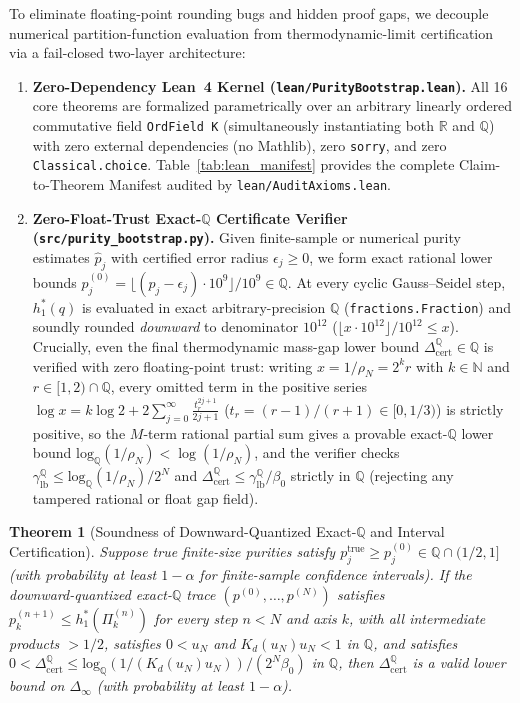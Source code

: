 \documentclass[11pt,a4paper]{article}
\newtheorem{theorem}{Theorem}[section]
\theoremstyle{definition}
\newcommand{\R}{\mathbb{R}}
\newcommand{\Q}{\mathbb{Q}}
\newcommand{\N}{\mathbb{N}}
\begin{document}
To eliminate floating-point rounding bugs and hidden proof gaps, we decouple numerical partition-function evaluation from thermodynamic-limit certification via a fail-closed two-layer architecture:
\begin{enumerate}[leftmargin=1.6em,itemsep=2pt]
  \item \textbf{Zero-Dependency Lean~4 Kernel (\texttt{lean/PurityBootstrap.lean}).} All 16 core theorems are formalized parametrically over an arbitrary linearly ordered commutative field \texttt{OrdField K} (simultaneously instantiating both $\R$ and $\Q$) with zero external dependencies (no Mathlib), zero \texttt{sorry}, and zero \texttt{Classical.choice}. Table~\ref{tab:lean_manifest} provides the complete Claim-to-Theorem Manifest audited by \texttt{lean/AuditAxioms.lean}.
  \item \textbf{Zero-Float-Trust Exact-$\Q$ Certificate Verifier (\texttt{src/purity\_bootstrap.py}).} Given finite-sample or numerical purity estimates $\hat{p}_j$ with certified error radius $\epsilon_j \ge 0$, we form exact rational lower bounds $p_j^{(0)} = \lfloor (\hat{p}_j - \epsilon_j) \cdot 10^9 \rfloor / 10^9 \in \Q$. At every cyclic Gauss--Seidel step, $h_1^*(q)$ is evaluated in exact arbitrary-precision $\Q$ (\texttt{fractions.Fraction}) and soundly rounded \emph{downward} to denominator $10^{12}$ ($\lfloor x \cdot 10^{12} \rfloor / 10^{12} \le x$). Crucially, even the final thermodynamic mass-gap lower bound $\Delta_{\mathrm{cert}}^{\Q} \in \Q$ is verified with zero floating-point trust: writing $x = 1/\rho_N = 2^k r$ with $k \in \N$ and $r \in [1, 2) \cap \Q$, every omitted term in the positive series $\log x = k\log 2 + 2\sum_{j=0}^{\infty} \frac{t_r^{2j+1}}{2j+1}$ ($t_r = (r-1)/(r+1) \in [0, 1/3)$) is strictly positive, so the $M$-term rational partial sum gives a provable exact-$\Q$ lower bound $\mathrm{log}_{\Q}(1/\rho_N) < \log(1/\rho_N)$, and the verifier checks $\gamma_{\mathrm{lb}}^{\Q} \le \mathrm{log}_{\Q}(1/\rho_N) / 2^N$ and $\Delta_{\mathrm{cert}}^{\Q} \le \gamma_{\mathrm{lb}}^{\Q}/\beta_0$ strictly in $\Q$ (rejecting any tampered rational or float gap field).
\end{enumerate}

\begin{theorem}[Soundness of Downward-Quantized Exact-$\Q$ and Interval Certification]
\label{thm:interval_mono}
Suppose true finite-size purities satisfy $p_j^{\mathrm{true}} \ge p_j^{(0)} \in \Q \cap (1/2, 1]$ (with probability at least $1-\alpha$ for finite-sample confidence intervals). If the downward-quantized exact-$\Q$ trace $(p^{(0)},\dots,p^{(N)})$ satisfies $p_k^{(n+1)} \le h_1^*(\Pi_{k}^{(n)})$ for every step $n < N$ and axis $k$, with all intermediate products $> 1/2$, satisfies $0 < u_N$ and $K_d(u_N) u_N < 1$ in $\Q$, and satisfies $0 < \Delta_{\mathrm{cert}}^{\Q} \le \mathrm{log}_{\Q}(1/(K_d(u_N)u_N)) / (2^N \beta_0)$ in $\Q$, then $\Delta_{\mathrm{cert}}^{\Q}$ is a valid lower bound on $\Delta_\infty$ (with probability at least $1-\alpha$).
\end{theorem}
\end{document}
